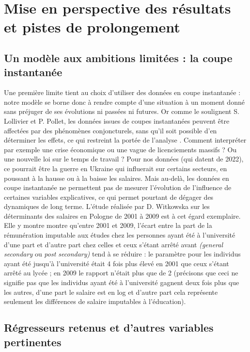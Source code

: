 \documentclass[a4paper, french, 11 pt]{article}\usepackage[]{graphicx}\usepackage[]{xcolor}
\begin{document}
\section{Mise en perspective des résultats et pistes de prolongement}

\subsection{Un modèle aux ambitions limitées : la coupe instantanée}

Une première limite tient au choix d’utiliser des données en coupe instantanée : notre modèle se borne donc à rendre compte d'une situation à un moment donné sans préjuger de ses évolutions ni passées ni futures. Or comme le soulignent S. Lollivier et P. Pollet, les données issues de coupes instantanées peuvent être affectées par des phénomènes conjoncturels, sans qu'il soit possible d'en déterminer les effets, ce qui restreint la portée de l'analyse \parencite{lollivier2003}. Comment interpréter par exemple une crise économique ou une vague de licenciements massifs ? Ou une nouvelle loi sur le temps de travail ? Pour nos données (qui datent de 2022), ce pourrait être la guerre en Ukraine qui influerait sur certains secteurs, en poussant à la hausse ou à la baisse les salaires. Mais au-delà, les données en coupe instantanée ne permettent pas de mesurer l'évolution de l'influence de certaines variables explicatives, ce qui permet pourtant de dégager des dynamiques de long terme.   L'étude réalisée par D. Witkowska sur les déterminants des salaires en Pologne de 2001 à 2009 est à cet égard exemplaire. Elle y montre montre qu'entre 2001 et 2009, l'écart entre la part de la rémunération imputable aux études chez les personnes ayant été à l'université d'une part et d'autre part chez celles et ceux s’étant arrêté avant \textit{(general secondary} ou \textit{post secondary)} tend à se réduire : le paramètre pour les individus ayant été jusqu’à l’université était 4 fois plus élevé en 2001 que ceux s’étant arrêté au lycée ; en 2009 le rapport n’était plus que de 2 \parencite[p. 206]{witkowska2014} (précisons que ceci ne signifie pas que les individus ayant été à l’université gagnent deux fois plus que les autres, d’une part le salaire est en log et d’autre part cela représente seulement les différences de salaire imputables à l’éducation).

\subsection{Régresseurs retenus et d'autres variables pertinentes}
\end{document}
